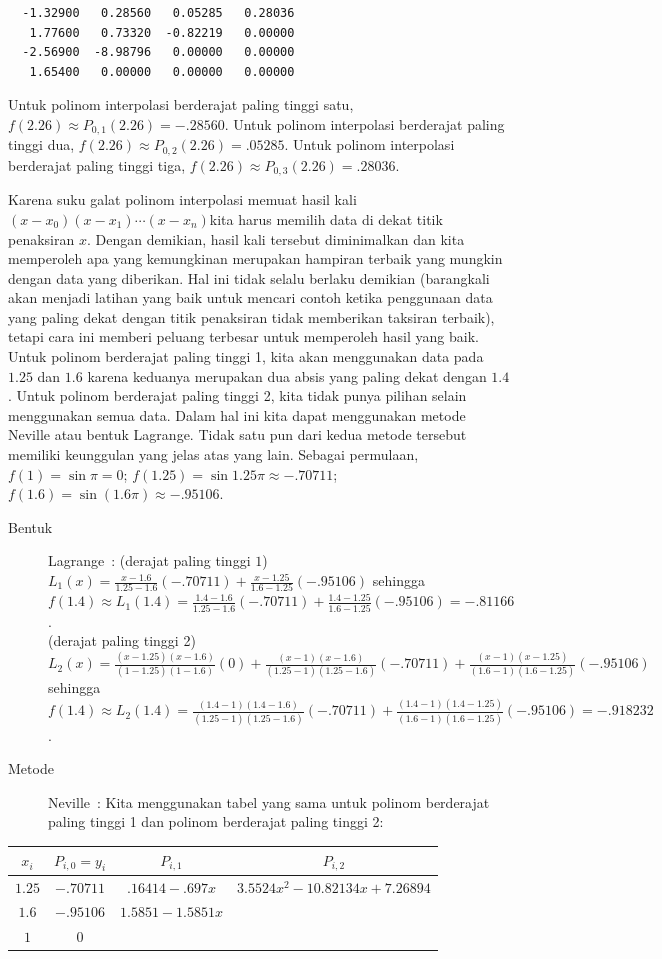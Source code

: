 \begin{description}
\begin{verbatim}
  -1.32900   0.28560   0.05285   0.28036
   1.77600   0.73320  -0.82219   0.00000
  -2.56900  -8.98796   0.00000   0.00000
   1.65400   0.00000   0.00000   0.00000
\end{verbatim} Untuk polinom interpolasi berderajat paling tinggi satu, $f(2.26)\approx P_{0,1}(2.26)=-.28560$.
Untuk polinom interpolasi berderajat paling tinggi dua, $f(2.26)\approx P_{0,2}(2.26)=.05285$.
Untuk polinom interpolasi berderajat paling tinggi tiga, $f(2.26)\approx P_{0,3}(2.26)=.28036$.
\item [{\ref{exc:interpolation-lagrange-12}:}] Karena suku galat polinom
interpolasi memuat hasil kali $(x-x_{0})(x-x_{1})\cdots(x-x_{n})$kita
harus memilih data di dekat titik penaksiran $x$. Dengan demikian,
hasil kali tersebut diminimalkan dan kita memperoleh apa yang kemungkinan
merupakan hampiran terbaik yang mungkin dengan data yang diberikan.
Hal ini tidak selalu berlaku demikian (barangkali akan menjadi latihan
yang baik untuk mencari contoh ketika penggunaan data yang paling
dekat dengan titik penaksiran tidak memberikan taksiran terbaik),
tetapi cara ini memberi peluang terbesar untuk memperoleh hasil yang
baik. Untuk polinom berderajat paling tinggi 1, kita akan menggunakan
data pada $1.25$ dan $1.6$ karena keduanya merupakan dua absis yang
paling dekat dengan $1.4$. Untuk polinom berderajat paling tinggi
2, kita tidak punya pilihan selain menggunakan semua data. Dalam hal
ini kita dapat menggunakan metode Neville atau bentuk Lagrange. Tidak
satu pun dari kedua metode tersebut memiliki keunggulan yang jelas
atas yang lain. Sebagai permulaan, $f(1)=\sin\pi=0$; $f(1.25)=\sin1.25\pi\approx-.70711$;
$f(1.6)=\sin(1.6\pi)\approx-.95106$.

\begin{description}
\item [{Bentuk}] Lagrange~: (derajat paling tinggi $1$) $L_{1}(x)=\frac{x-1.6}{1.25-1.6}(-.70711)+\frac{x-1.25}{1.6-1.25}(-.95106)$
sehingga $f(1.4)\approx L_{1}(1.4)=\frac{1.4-1.6}{1.25-1.6}(-.70711)+\frac{1.4-1.25}{1.6-1.25}(-.95106)=-.81166$.\\
(derajat paling tinggi 2) $L_{2}(x)=\frac{(x-1.25)(x-1.6)}{(1-1.25)(1-1.6)}(0)+\frac{(x-1)(x-1.6)}{(1.25-1)(1.25-1.6)}(-.70711)+\frac{(x-1)(x-1.25)}{(1.6-1)(1.6-1.25)}(-.95106)$
sehingga $f(1.4)\approx L_{2}(1.4)=\frac{(1.4-1)(1.4-1.6)}{(1.25-1)(1.25-1.6)}(-.70711)+\frac{(1.4-1)(1.4-1.25)}{(1.6-1)(1.6-1.25)}(-.95106)=-.918232$.
\item [{Metode}] Neville~: Kita menggunakan tabel yang sama untuk polinom
berderajat paling tinggi 1 dan polinom berderajat paling tinggi 2:
\end{description}
\begin{center}
\begin{tabular}{c|ccc}
$x_{i}$ & $P_{i,0}=y_{i}$ & $P_{i,1}$ & $P_{i,2}$\tabularnewline
\hline 
$1.25$ & $-.70711$ & $.16414-.697x$ & $3.5524x^{2}-10.82134x+7.26894$\tabularnewline
$1.6$ & $-.95106$ & $1.5851-1.5851x$ & \tabularnewline
$1$ & $0$ &  & \tabularnewline
\end{tabular}
\par\end{center}


\end{description}
